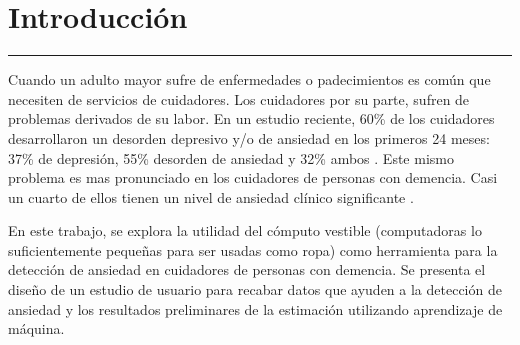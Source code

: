 
\chapter{Introducci\'on}\label{capit:cap1}
\vspace{-2.0325ex}%
\noindent
\rule{\textwidth}{0.5pt}
\vspace{-5.5ex}%
\newcommand{\pushline}{\Indp}


Cuando un adulto mayor sufre de enfermedades o padecimientos es com\'un que necesiten de servicios de cuidadores. Los cuidadores por su parte, sufren de problemas derivados de su labor. En un estudio reciente, 60\% de los cuidadores desarrollaron un desorden depresivo y/o de ansiedad en los primeros 24 meses: 37\% de depresi\'on, 55\% desorden de ansiedad y 32\% ambos \citep{Joling2014}. Este mismo problema es mas pronunciado en los cuidadores de personas con demencia.  Casi un cuarto de ellos tienen un nivel de ansiedad cl\'inico significante \citep{Cooper200615}.

	En este trabajo, se explora la utilidad del c\'omputo vestible (computadoras lo suficientemente peque\~nas para ser usadas como ropa) como herramienta para la detecci\'on de ansiedad en cuidadores de personas con demencia. Se presenta el dise\~no de un estudio de usuario para recabar datos que ayuden a la detecci\'on de ansiedad y los resultados preliminares de la estimaci\'on utilizando aprendizaje de m\'aquina.
	
	
	
	
	

	


